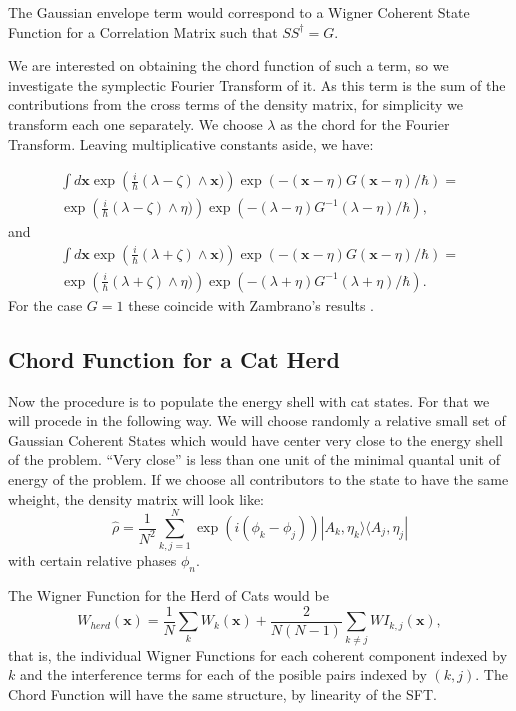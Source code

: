 \documentclass[a4paper,12pt]{article}
\newcommand{\ihb}{\frac{i}{\hbar}}
\newcommand{\xfase}{\mathbf{x}}
\newcommand{\bra}[1]{\langle #1|}
\newcommand{\ket}[1]{|#1\rangle}
\begin{document}
The Gaussian envelope term would correspond to a Wigner Coherent State
Function for a Correlation Matrix such that $SS^\dagger=G$.

We are interested
on obtaining the chord function of such a term, so we investigate
the symplectic Fourier Transform of it.
As this term is the sum of the contributions from the cross terms
of the density matrix, for simplicity we transform each one separately.
We choose $\lambda$ as the chord for the Fourier Transform.
Leaving multiplicative constants aside, we have:

\begin{multline}
\int d \xfase \exp \left(\ihb (\lambda-\zeta)\wedge \xfase) \right)
\exp \left( -(\xfase-\eta)G (\xfase-\eta)/\hbar \right) =\\
\exp \left(\ihb (\lambda-\zeta)\wedge \eta) \right)
\exp \left( -(\lambda-\eta)G^{-1}(\lambda-\eta)/\hbar \right),
\end{multline}
and
\begin{multline}
\int d \xfase \exp \left(\ihb (\lambda+\zeta)\wedge \xfase) \right)
\exp \left( -(\xfase-\eta)G (\xfase-\eta)/\hbar \right) =\\
\exp \left(\ihb (\lambda+\zeta)\wedge \eta) \right)
\exp \left( -(\lambda+\eta)G^{-1}(\lambda+\eta)/\hbar \right).
\end{multline}
For the case $G=1$ these coincide with Zambrano's results 
\cite{tesiseduardo}.

\subsection{Chord Function for a Cat Herd}

Now the procedure is to populate the energy shell with cat states. For that
we will procede in the following way. We will choose randomly a relative
small set of Gaussian Coherent States which would have center very
close to the energy shell of the problem. ``Very close'' is
less than  one unit of the minimal quantal unit of energy of the problem.
If we choose all contributors to the state to have the same wheight,
the density matrix will look like:
\begin{equation}
\hat{\rho}=\frac{1}{N^2}\sum_{k,j=1}^{N}
\exp(i(\phi_k-\phi_j))\ket{A_k,\eta_k}\bra{A_j, \eta_j}
\end{equation}
with certain relative phases $\phi_n$.

The Wigner Function for the Herd of Cats would be
\begin{equation}
W_{herd}(\xfase)=\frac{1}{N}\sum_k W_k(\xfase)
+\frac{2}{N(N-1)}\sum_{k\neq j}WI_{k,j}(\xfase),
\end{equation}
that is, the individual Wigner Functions for each coherent
component indexed by $k$ and the interference terms for each of the
posible pairs indexed by $(k,j)$. The Chord Function will have
the same structure, by linearity of the SFT. 





\end{document}
